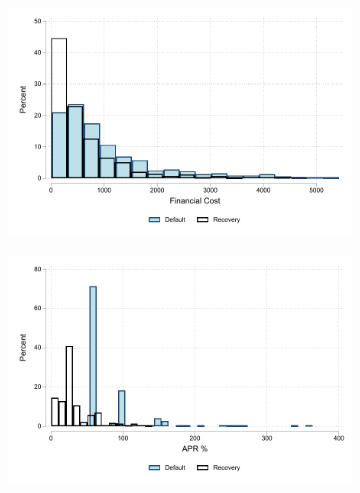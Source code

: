  


\begin{figure}[!h]
\caption{Financial cost.}
  \label{fc_hist}
    \begin{center}
    \begin{subfigure}{.42\textwidth}
        \centering
        \includegraphics[width=\textwidth]{Figuras/hist_fc.pdf}
        \caption{}
    \end{subfigure}
     \begin{subfigure}{0.42\textwidth}
       \centering
      \includegraphics[width=\textwidth]{Figuras/hist_apr.pdf}
      \caption{}
    \end{subfigure}
    \end{center}
 

\end{figure}
